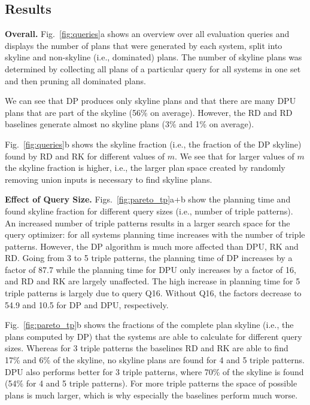 \subsection{Results}

\textbf{Overall.} Fig.~\ref{fig:queries}a shows an overview over all
evaluation queries and displays the number of plans that were
generated by each system, split into skyline and non-skyline (i.e.,
dominated) plans. The number of skyline plans was determined by
collecting all plans of a particular query for all systems in one set
and then pruning all dominated plans. 

We can see that DP produces only skyline plans and that there are many
DPU plans that are part of the skyline (56\% on average). However, the
RD and RD baselines generate almost no skyline plans (3\% and 1\% on
average). 

Fig.~\ref{fig:queries}b shows the skyline fraction (i.e., the fraction
of the DP skyline) found by RD and RK for different values of $m$. We
see that for larger values of $m$ the skyline fraction is higher,
i.e., the larger plan space created by randomly removing union inputs
is necessary to find skyline plans.

\textbf{Effect of Query Size.} Figs.~\ref{fig:pareto_tp}a+b show the
planning time and found skyline fraction for different query sizes
(i.e., number of triple patterns). An increased number of triple
patterns results in a larger search space for the query optimizer: for
all systems planning time increases with the number of triple
patterns. However, the DP algorithm is much more affected than DPU, RK
and RD. Going from 3 to 5 triple patterns, the planning time of DP
increases by a factor of 87.7 while the planning time for DPU only
increases by a factor of 16, and RD and RK are largely unaffected. The
high increase in planning time for 5 triple patterns is largely due to
query Q16. Without Q16, the factors decrease to 54.9 and 10.5 for DP
and DPU, respectively.

Fig.~\ref{fig:pareto_tp}b shows the fractions of the complete plan
skyline (i.e., the plans computed by DP) that the systems are able to
calculate for different query sizes. Whereas for 3 triple patterns the
baselines RD and RK are able to find 17\% and 6\% of the skyline, no
skyline plans are found for 4 and 5 triple patterns. DPU also performs
better for 3 triple patterns, where 70\% of the skyline is found (54\%
for 4 and 5 triple patterns). For more triple patterns the space of
possible plans is much larger, which is why especially the baselines
perform much worse.

